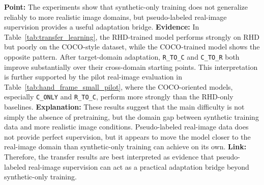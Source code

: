 \documentclass[10pt,letterpaper]{article}
\begin{document}
\medskip
\noindent\textbf{Point:} The experiments show that synthetic-only training does not generalize reliably to more realistic image domains, but pseudo-labeled real-image supervision provides a useful adaptation bridge.  
\textbf{Evidence:} In Table~\ref{tab:transfer_learning}, the RHD-trained model performs strongly on RHD but poorly on the COCO-style dataset, while the COCO-trained model shows the opposite pattern. After target-domain adaptation, \texttt{R\_TO\_C} and \texttt{C\_TO\_R} both improve substantially over their cross-domain starting points. This interpretation is further supported by the pilot real-image evaluation in Table~\ref{tab:hand_frame_small_pilot}, where the COCO-oriented models, especially \texttt{C\_ONLY} and \texttt{R\_TO\_C}, perform more strongly than the RHD-only baselines.  
\textbf{Explanation:} These results suggest that the main difficulty is not simply the absence of pretraining, but the domain gap between synthetic training data and more realistic image conditions. Pseudo-labeled real-image data does not provide perfect supervision, but it appears to move the model closer to the real-image domain than synthetic-only training can achieve on its own.  
\textbf{Link:} Therefore, the transfer results are best interpreted as evidence that pseudo-labeled real-image supervision can act as a practical adaptation bridge beyond synthetic-only training.

\begin{table}[t]
\centering
\footnotesize
\caption{Transfer-learning results for the four training sequences evaluated on both RHD and the COCO-style hand dataset. Values are mean $\pm$ std over five seeds, and fusion-mode evaluation is shown because it is the main operating mode in the study.}
\label{tab:transfer_learning}
\end{table}
\end{document}
